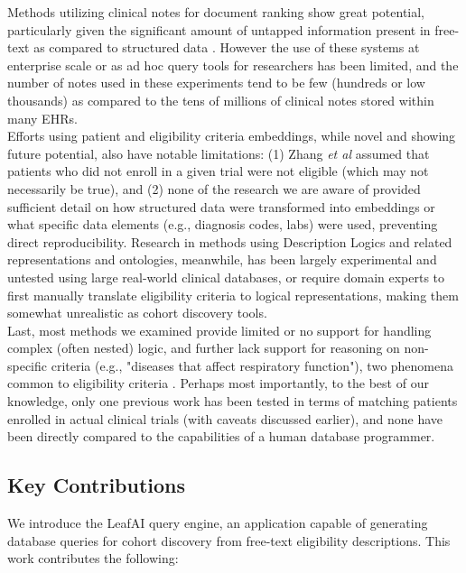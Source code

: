 \documentclass[../main.tex]{subfiles}
\begin{document}
\noindent Methods utilizing clinical notes for document ranking show great potential, particularly given the significant amount of untapped information present in free-text as compared to structured data \cite{warrer2012using}. However the use of these systems at enterprise scale or as ad hoc query tools for researchers has been limited, and the number of notes used in these experiments tend to be few (hundreds or low thousands) as compared to the tens of millions of clinical notes stored within many EHRs. \\

\noindent Efforts using patient and eligibility criteria embeddings, while novel and showing future potential, also have notable limitations: (1) Zhang \textit{et al} assumed that patients who did not enroll in a given trial were not eligible (which may not necessarily be true), and (2) none of the research we are aware of provided sufficient detail on how structured data were transformed into embeddings or what specific data elements (e.g., diagnosis codes, labs) were used, preventing direct reproducibility.  Research in methods using Description Logics and related representations and ontologies, meanwhile, has been largely experimental and untested using large real-world clinical databases, or require domain experts to first manually translate eligibility criteria to logical representations, making them somewhat unrealistic as cohort discovery tools. \\

\noindent Last, most methods we examined provide limited or no support for handling complex (often nested) logic, and further lack support for reasoning on non-specific criteria (e.g., "diseases that affect respiratory function"), two phenomena common to eligibility criteria \cite{wang2017classifying, ross2010analysis}. Perhaps most importantly, to the best of our knowledge, only one previous work has been tested in terms of matching patients enrolled in actual clinical trials \cite{zhang2020deepenroll} (with caveats discussed earlier), and none have been directly compared to the capabilities of a human database programmer. 

\subsection*{Key Contributions}

\noindent We introduce the LeafAI query engine, an application capable of generating database queries for cohort discovery from free-text eligibility descriptions. This work contributes the following:
\end{document}
